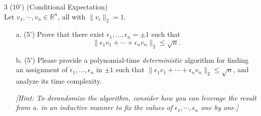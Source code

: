     
    \begin{question}{3 (10') (Conditional Expectation)}~\\ 
    Let $v_1, \cdots, v_n \in \mathbb R^n$, all with $\|v_i\|_2= 1$.
    \begin{enumerate}
        \item [a. (5')] Prove that there exist $\epsilon_1, \dots, \epsilon_n =\pm 1$ such that
              $$ 
              \|\epsilon_1 v_1 + \cdots + \epsilon_n v_n\|_2 \leq \sqrt{n}.
              $$

        \item [b. (5')] Please provide a polynomial-time \textit{deterministic} algorithm for finding an assignment of $\epsilon_1,\dots, \epsilon_n$ in $\pm1$ such that $\|\epsilon_1 v_1 + \cdots + \epsilon_n v_n\|_2 \leq \sqrt{n}$, and analyze its time complexity. 

        \textit{[Hint: To derandomize the algorithm, consider how you can leverage the result from \textnormal{a.} in an inductive manner to fix the values of $\epsilon_1, \cdots, \epsilon_n$ one by one.]}
    \end{enumerate}
    \end{question}